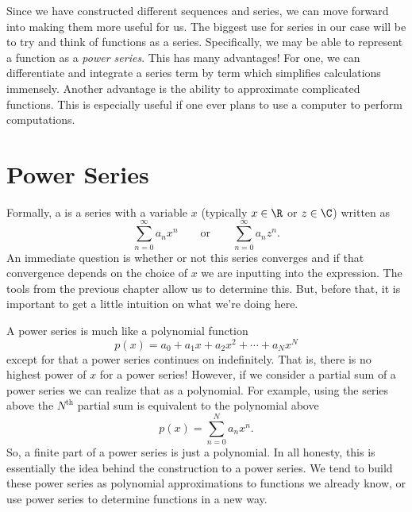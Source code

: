 Since we have constructed different sequences and series, we can move forward into making them more useful for us.  The biggest use for series in our case will be to try and think of functions as a series. Specifically, we may be able to represent a function as a \emph{power series}.  This has many advantages! For one, we can differentiate and integrate a series term by term which simplifies calculations immensely.  Another advantage is the ability to approximate complicated functions.  This is especially useful if one ever plans to use a computer to perform computations.  

\section{Power Series}

Formally, a  is a series with a variable $x$ (typically $x\in \R$ or $z\in \C$) written as
\[
\sum_{n=0}^\infty a_n x^n \qquad \textrm{or} \qquad \sum_{n=0}^\infty a_n z^n.
\]
An immediate question is whether or not this series converges and if that convergence depends on the choice of $x$ we are inputting into the expression.  The tools from the previous chapter allow us to determine this.  But, before that, it is important to get a little intuition on what we're doing here.

A power series is much like a polynomial function
\[
p(x) = a_0 + a_1 x + a_2 x^2 + \cdots + a_N x^N
\]
except for that a power series continues on indefinitely. That is, there is no highest power of $x$ for a power series!  However, if we consider a partial sum of a power series we can realize that as a polynomial. For example, using the series above the $N^\textrm{th}$ partial sum is equivalent to the polynomial above
\[
p(x)=\sum_{n=0}^N a_n x^n.
\]
So, a finite part of a power series is just a polynomial.  In all honesty, this is essentially the idea behind the construction to a power series.  We tend to build these power series as polynomial approximations to functions we already know, or use power series to determine functions in a new way.

